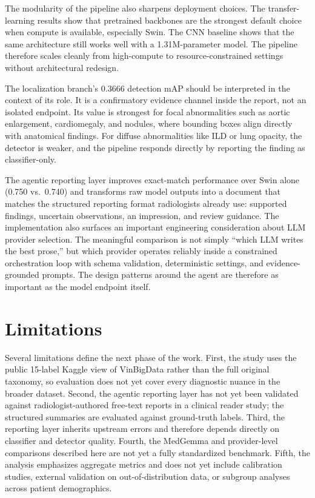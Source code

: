 \documentclass[conference]{IEEEtran}
\begin{document}
The modularity of the pipeline also sharpens deployment choices. The transfer-learning results show that pretrained backbones are the strongest default choice when compute is available, especially Swin. The CNN baseline shows that the same architecture still works well with a 1.31M-parameter model. The pipeline therefore scales cleanly from high-compute to resource-constrained settings without architectural redesign.

The localization branch's 0.3666 detection mAP should be interpreted in the context of its role. It is a confirmatory evidence channel inside the report, not an isolated endpoint. Its value is strongest for focal abnormalities such as aortic enlargement, cardiomegaly, and nodules, where bounding boxes align directly with anatomical findings. For diffuse abnormalities like ILD or lung opacity, the detector is weaker, and the pipeline responds directly by reporting the finding as classifier-only.

The agentic reporting layer improves exact-match performance over Swin alone (0.750 vs.\ 0.740) and transforms raw model outputs into a document that matches the structured reporting format radiologists already use: supported findings, uncertain observations, an impression, and review guidance. The implementation also surfaces an important engineering consideration about LLM provider selection. The meaningful comparison is not simply ``which LLM writes the best prose,'' but which provider operates reliably inside a constrained orchestration loop with schema validation, deterministic settings, and evidence-grounded prompts. The design patterns around the agent are therefore as important as the model endpoint itself.

\section{Limitations}
Several limitations define the next phase of the work. First, the study uses the public 15-label Kaggle view of VinBigData rather than the full original taxonomy, so evaluation does not yet cover every diagnostic nuance in the broader dataset. Second, the agentic reporting layer has not yet been validated against radiologist-authored free-text reports in a clinical reader study; the structured summaries are evaluated against ground-truth labels. Third, the reporting layer inherits upstream errors and therefore depends directly on classifier and detector quality. Fourth, the MedGemma and provider-level comparisons described here are not yet a fully standardized benchmark. Fifth, the analysis emphasizes aggregate metrics and does not yet include calibration studies, external validation on out-of-distribution data, or subgroup analyses across patient demographics.
\end{document}
